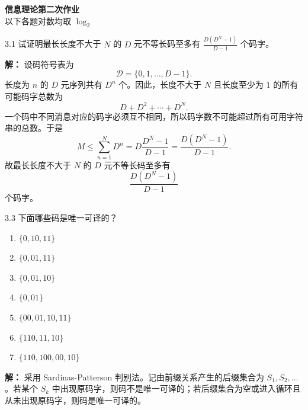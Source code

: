 \documentclass[UTF8,11pt,a4paper]{ctexart}
\begin{document}
\begin{center}
  {\bfseries 信息理论第二次作业}\\[0.4em]
  {\small 以下各题对数均取 $\log_2$}
\end{center}

\vspace{0.8em}

\begin{problem}{3.1}
试证明最长长度不大于 \(N\) 的 \(D\) 元不等长码至多有 \(\frac{D(D^N - 1)}{D-1}\) 个码字。
\end{problem}
\noindent\textbf{解：}
设码符号表为
\[
\mathcal{D}=\{0,1,\dots,D-1\}.
\]
长度为 $n$ 的 $D$ 元序列共有 $D^n$ 个。因此，长度不大于 $N$ 且长度至少为 $1$ 的所有可能码字总数为
\[
D+D^2+\cdots+D^N.
\]
一个码中不同消息对应的码字必须互不相同，所以码字数不可能超过所有可用字符串的总数。于是
\[
M\le \sum_{n=1}^{N}D^n
=D\frac{D^N-1}{D-1}
=\frac{D(D^N-1)}{D-1}.
\]
故最长长度不大于 $N$ 的 $D$ 元不等长码至多有
\[
\frac{D(D^N - 1)}{D-1}
\]
个码字。
\vspace{0.8em}

\begin{problem}{3.3}
下面哪些码是唯一可译的？
\begin{enumerate}[label=\textnormal{(\alph*)}]
  \item \(\{0,10,11\}\)
  \item \(\{0,01,11\}\)
  \item \(\{0,01,10\}\)
  \item \(\{0,01\}\)
  \item \(\{00,01,10,11\}\)
  \item \(\{110,11,10\}\)
  \item \(\{110,100,00,10\}\)
\end{enumerate}
\end{problem}
\noindent\textbf{解：}
采用 Sardinas-Patterson 判别法。记由前缀关系产生的后缀集合为 $S_1,S_2,\dots$。若某个 $S_k$ 中出现原码字，则码不是唯一可译的；若后缀集合为空或进入循环且从未出现原码字，则码是唯一可译的。
\end{document}
